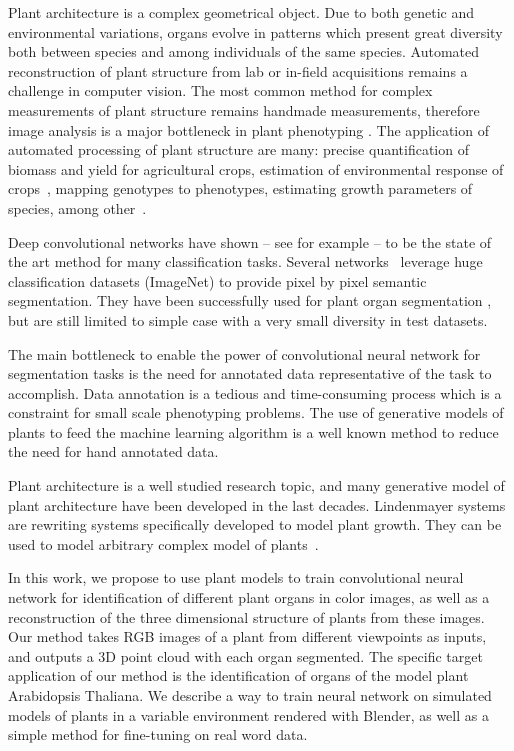 Plant architecture is a complex geometrical object. Due to both genetic and
environmental variations, organs evolve in patterns which present great diversity
both between species and among individuals of the same species. Automated
reconstruction of plant structure from lab or in-field acquisitions remains a challenge in computer
vision. The most common method for complex measurements of plant structure
remains handmade measurements, therefore image analysis is a major bottleneck in plant phenotyping
\cite{minervini2015image}. The application of automated processing of plant structure are many: precise
quantification of biomass and yield for agricultural crops, estimation of environmental response
of crops~\cite{peirone2018assessing, srivastava2017drought},  mapping genotypes to
phenotypes, estimating growth parameters of species, among other~\cite{denis1998symmetry}.

Deep convolutional networks have shown -- see for example \cite{krizhevsky2012imagenet} --
to be the state of the art method for many classification tasks. Several
networks~\cite{ronneberger2015u, long2015fully} leverage huge classification datasets (ImageNet) to provide pixel by
pixel semantic segmentation. They have been successfully used for plant organ
segmentation \cite{shi2019plant}, but are still limited to simple case with a very
small diversity in test datasets.

The main bottleneck to enable the power of convolutional neural network for segmentation
tasks is the need for annotated data representative of the task to accomplish.
Data annotation is a tedious and time-consuming process
which is a constraint for small scale phenotyping problems. The use of generative
models of plants to feed the machine learning algorithm is a well known method to
reduce the need for hand annotated data.

Plant architecture is a well studied research topic, and many generative model
of plant architecture have been developed in the last decades. Lindenmayer
systems are rewriting systems specifically developed to model plant growth.
They can be used to model arbitrary complex model of plants~\cite{boudon_l-py:_2012}.

In this work, we propose to use plant models to train convolutional neural network for
identification of different plant organs in color images, as well as a
reconstruction of the three dimensional structure of plants from these images. Our method takes RGB images of a plant from different viewpoints as inputs, and outputs a 3D point cloud with each organ segmented.
The specific target application of our method is the identification of organs of the model
plant Arabidopsis Thaliana. We describe a way to train neural network on simulated models of
plants in a variable environment rendered with Blender, as well as a simple method for
fine-tuning on real word data. 


